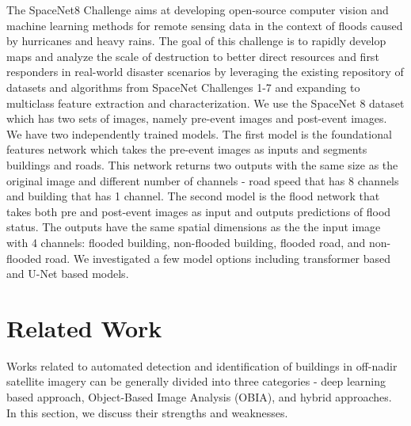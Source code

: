 \documentclass[10pt,twocolumn,letterpaper]{article}
\begin{document}
The SpaceNet8 Challenge \cite{spacenet8} aims at developing open-source computer vision and machine learning methods for remote sensing data in the context of floods caused by hurricanes and heavy rains. The goal of this challenge is to rapidly develop maps and analyze the scale of destruction to better direct resources and first responders in real-world disaster scenarios by leveraging the existing repository of datasets and algorithms from SpaceNet Challenges 1-7 and expanding to multiclass feature extraction and characterization. We use the SpaceNet 8 dataset which has two sets of images, namely pre-event images and post-event images. We have two independently trained models. The first model is the foundational features network which takes the pre-event images as inputs and segments buildings and roads. This network returns two outputs with the same size as the original image and different number of channels - road speed that has 8 channels and building that has 1 channel. The second model is the flood network that takes both pre and post-event images as input and outputs predictions of flood status. The outputs have the same spatial dimensions as the the input image with 4 channels: flooded building, non-flooded building, flooded road, and non-flooded road. We investigated a few model options including transformer based and U-Net based models. 





\section{Related Work}
\label{sec:related}

Works related to automated detection and identification of buildings in off-nadir satellite imagery can be generally divided into three categories - deep learning based approach, Object-Based Image Analysis (OBIA), and hybrid approaches. In this section, we discuss their strengths and weaknesses.
\end{document}

